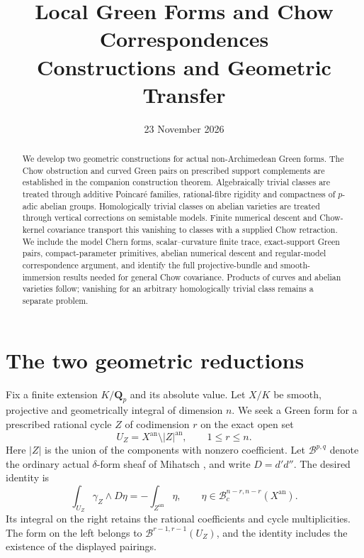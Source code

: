 \documentclass[11pt]{article}
\title{Local Green Forms and Chow Correspondences\\Constructions and Geometric Transfer}
\author{}
\date{23 November 2026}
\theoremstyle{definition}
\theoremstyle{remark}
\numberwithin{equation}{section}
\newcommand{\an}{\mathrm{an}}
\newcommand{\B}{\mathcal B}
\begin{document}
\maketitle
\begin{abstract}
We develop two geometric constructions for actual non-Archimedean Green forms. The Chow obstruction and curved Green pairs on prescribed support complements are established in the companion construction theorem. Algebraically trivial classes are treated through additive Poincar\'e families, rational-fibre rigidity and compactness of $p$-adic abelian groups. Homologically trivial classes on abelian varieties are treated through vertical corrections on semistable models. Finite numerical descent and Chow-kernel covariance transport this vanishing to classes with a supplied Chow retraction. We include the model Chern forms, scalar--curvature finite trace, exact-support Green pairs, compact-parameter primitives, abelian numerical descent and regular-model correspondence argument, and identify the full projective-bundle and smooth-immersion results needed for general Chow covariance. Products of curves and abelian varieties follow; vanishing for an arbitrary homologically trivial class remains a separate problem.
\end{abstract}

\tableofcontents

\section{The two geometric reductions}\label{sec:construction-introduction}

Fix a finite extension $K/\mathbf Q_p$ and its absolute value. Let $X/K$ be smooth, projective and geometrically integral of dimension $n$. We seek a Green form for a prescribed rational cycle $Z$ of codimension $r$ on the exact open set
\[
 U_Z=X^{\an}\setminus |Z|^{\an},\qquad 1\le r\le n.
\]
Here $|Z|$ is the union of the components with nonzero coefficient. Let $\B^{p,q}$ denote the ordinary actual $\delta$-form sheaf of Mihatsch \cite{M}, and write $D=d'd''$. The desired identity is
\begin{equation}\label{eq:main-green}
 \int_{U_Z}\gamma_Z\wedge D\eta
 =-\int_{Z^{\an}}\eta,
 \qquad \eta\in\B_c^{n-r,n-r}(X^{\an}).
\end{equation}
Its integral on the right retains the rational coefficients and cycle multiplicities. The form on the left belongs to $\B^{r-1,r-1}(U_Z)$, and the identity includes the existence of the displayed pairings.
\end{document}
